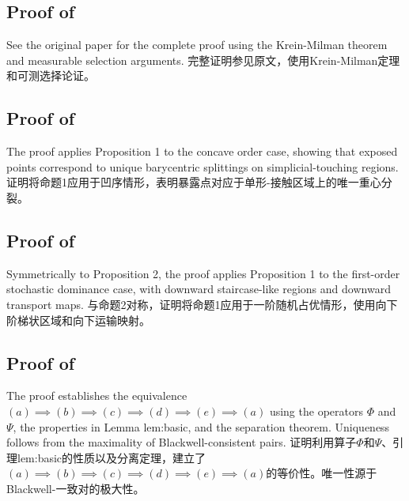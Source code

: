 \documentclass[12pt,letterpaper]{article}
\newenvironment{original}{\color{black}}{}
\newenvironment{translation}{\color{blue}}{}
\theoremstyle{plain}
\theoremstyle{definition}
\theoremstyle{remark}
\theoremstyle{definition}
\begin{document}
\subsection{Proof of \texorpdfstring{}{Proposition 1}}
\begin{original}
See the original paper for the complete proof using the Krein-Milman theorem and measurable selection arguments.
\end{original}
\begin{translation}
完整证明参见原文，使用Krein-Milman定理和可测选择论证。
\end{translation}

\subsection{Proof of \texorpdfstring{}{Proposition 2}}
\begin{original}
The proof applies Proposition 1 to the concave order case, showing that exposed points correspond to unique barycentric splittings on simplicial-touching regions.
\end{original}
\begin{translation}
证明将命题1应用于凹序情形，表明暴露点对应于单形-接触区域上的唯一重心分裂。
\end{translation}

\subsection{Proof of \texorpdfstring{}{Proposition 3}}
\begin{original}
Symmetrically to Proposition 2, the proof applies Proposition 1 to the first-order stochastic dominance case, with downward staircase-like regions and downward transport maps.
\end{original}
\begin{translation}
与命题2对称，证明将命题1应用于一阶随机占优情形，使用向下阶梯状区域和向下运输映射。
\end{translation}

\subsection{Proof of \texorpdfstring{}{Theorem 3}}
\begin{original}
The proof establishes the equivalence $(a)\implies(b)\implies(c)\implies(d)\implies(e)\implies(a)$ using the operators $\Phi$ and $\Psi$, the properties in Lemma lem:basic, and the separation theorem. Uniqueness follows from the maximality of Blackwell-consistent pairs.
\end{original}
\begin{translation}
证明利用算子$\Phi$和$\Psi$、引理lem:basic的性质以及分离定理，建立了$(a)\implies(b)\implies(c)\implies(d)\implies(e)\implies(a)$的等价性。唯一性源于Blackwell-一致对的极大性。
\end{translation}
\end{document}
